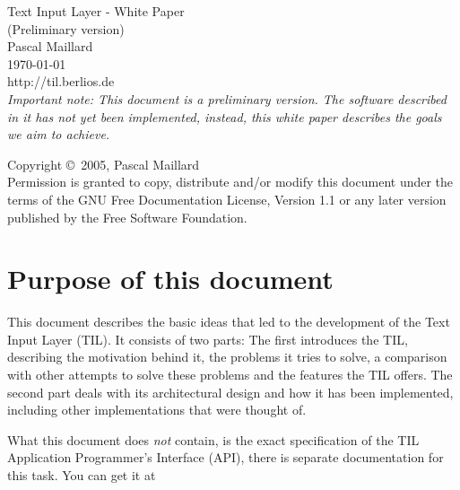 \documentclass[a4paper]{article}
\def\tilurl{http://til.berlios.de}
\begin{document}

\begin{titlepage}
\vspace*{4cm}
\begin{center}
\huge{Text Input Layer - White Paper}\\
\huge{(Preliminary version)}\\
\vspace{1cm}
\large{Pascal Maillard}\\
\vspace{.5cm}
\large{\today}\\
\vspace{1cm}
\large{\tilurl}\\
\vspace{1cm}
\large{\emph{Important note: This document is a preliminary version. The software described in it has \emph{not yet been implemented}, instead, this white paper describes the goals we aim to achieve.}}\\
\end{center}
\vfill
Copyright \copyright\ 2005, Pascal Maillard\\
Permission is granted to copy, distribute and/or modify this document under the terms of the GNU Free Documentation License, Version 1.1 or any later version published by the Free Software Foundation.
\end{titlepage}

\begin{titlepage}
\tableofcontents
\listoffigures
\listoftables
\end{titlepage}

\section{Purpose of this document}

This document describes the basic ideas that led to the development of the Text Input Layer (TIL). It consists of two parts: The first introduces the TIL, describing the motivation behind it, the problems it tries to solve, a comparison with other attempts to solve these problems and the features the TIL offers. The second part deals with its architectural design and how it has been implemented, including other implementations that were thought of.

What this document does \emph{not} contain, is the exact specification of the TIL Application Programmer's Interface (API), there is separate documentation for this task. You can get it at
\end{document}
